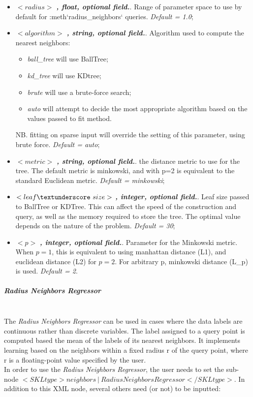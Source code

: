 \begin{itemize}
\item $<radius>$ \textbf{\textit{, float, optional field.}}.  Range of parameter space to use by default for :meth`radius\_neighbors` queries. \textit{Default = 1.0};
\item $<algorithm>$ \textbf{\textit{, string, optional field.}}.  Algorithm used to compute the nearest neighbors:
\begin{itemize}
\item \textit{ball\_tree} will use BallTree;
\item \textit{kd\_tree} will use KDtree;
\item \textit{brute} will use a brute-force search;
\item \textit{auto} will attempt to decide the most appropriate algorithm based on the values passed to fit method.
\end{itemize}
NB. fitting on sparse input will override the setting of this parameter, using brute force. \textit{Default = auto};
\item $<metric>$ \textbf{\textit{, string, optional field.}}.  the distance metric to use for the tree. The default metric is minkowski, and with p=2 is equivalent to the standard Euclidean metric. \textit{Default = minkowski};
\item $<leaf\textunderscore~size>$ \textbf{\textit{, integer, optional field.}}.  Leaf size passed to BallTree or KDTree. This can affect the speed of the construction and query, as well as the memory required to store the tree. The optimal value depends on the nature of the problem. \textit{Default = 30};
\item $<p>$ \textbf{\textit{, integer, optional field.}}.  Parameter for the Minkowski metric. When $p = 1$, this is equivalent to using manhattan distance (L1), and euclidean distance (L2) for $p = 2$. For arbitrary p, minkowski distance (L\_p) is used. \textit{Default = 2}.
\end{itemize}
\subparagraph{Radius Neighbors Regressor}
\mbox{}
\\The \textit{Radius Neighbors Regressor}  can be used in cases where the data labels are continuous rather than discrete variables. The label assigned to a query point is computed based the mean of the labels of its nearest neighbors. It implements learning based on the neighbors within a fixed radius r of the query point, where r is a floating-point value specified by the user.
\\In order to use the   \textit{Radius Neighbors Regressor}, the user needs to set the sub-node $<SKLtype>neighbors~\vert~RadiusNeighborsRegressor</SKLtype>$. In addition to this XML node, several others need (or not) to be inputted:
